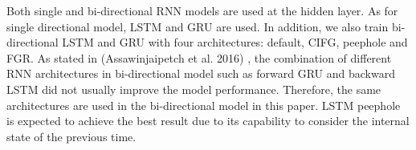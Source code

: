 Both single and bi-directional RNN models are used at the hidden layer.
As for single directional model, LSTM and GRU are used. 
In addition, we also train bi-directional LSTM and GRU with four architectures: 
default, CIFG, peephole and FGR. 
As stated in (Assawinjaipetch et al. 2016) \cite{assawinjaipetch-etal-2016-recurrent}, 
the combination of different RNN architectures in bi-directional model 
such as forward GRU and backward LSTM did not usually improve the model performance.
Therefore, the same architectures are used 
in the bi-directional model in this paper. 
LSTM peephole is expected to achieve the best result due to its 
capability to consider the internal state of the previous time.